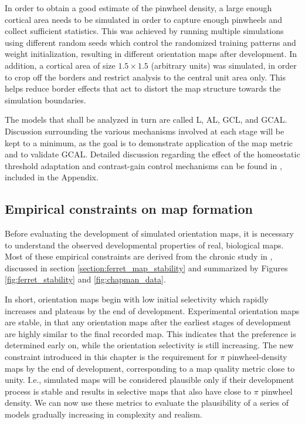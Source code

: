 \documentclass[phd,ianc,twoside]{infthesis}
\begin{document}
In order to obtain a good estimate of the pinwheel density, a large
enough cortical area needs to be simulated in order to capture enough
pinwheels and collect sufficient statistics. This was achieved by
running multiple simulations using different random seeds which control
the randomized training patterns and weight initialization, resulting in
different orientation maps after development. In addition, a cortical
area of size $1.5\times1.5$ (arbitrary units) was simulated, in order to
crop off the borders and restrict analysis to the central unit area
only. This helps reduce border effects that act to distort the map
structure towards the simulation boundaries.

The models that shall be analyzed in turn are called L, AL, GCL, and
GCAL. Discussion surrounding the various mechanisms involved at each 
stage will be kept to a minimum, as the goal is to demonstrate
application of the map metric and to validate GCAL. Detailed discussion
regarding the effect of the homeostatic threshold adaptation and
contrast-gain control mechanisms can be found in \citet{stevens_jn13},
included in the Appendix.

\subsection{Empirical constraints on map formation}

Before evaluating the development of simulated orientation maps, it is
necessary to understand the observed developmental properties of real,
biological maps. Most of these empirical constraints are derived from the
chronic study in \citet{chapman_jn96}, discussed in section
\ref{section:ferret_map_stability} and summarized by Figures
\ref{fig:ferret_stability} and \ref{fig:chapman_data}.

In short, orientation maps begin with low initial selectivity which
rapidly increases and plateaus by the end of development. Experimental
orientation maps are stable, in that any orientation maps after the earliest stages of
development are highly similar to the final recorded map. This indicates
that the preference is determined early on, while the orientation
selectivity is still increasing.
The new constraint introduced in this chapter is the requirement for
$\pi$ pinwheel-density maps by the end of development, corresponding to
a map quality metric close to unity.  I.e., simulated maps will be
considered plausible only if their development process is stable and
results in selective maps that also have close to $\pi$ pinwheel
density.  We can now use these metrics to evaluate the plausibility of
a series of models gradually increasing in complexity and realism.
\end{document}
